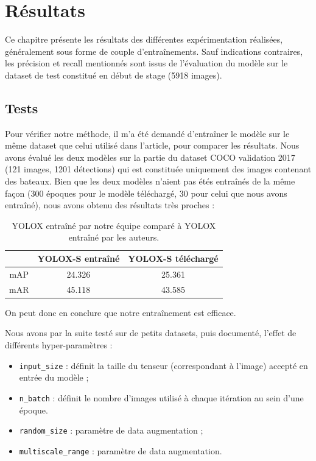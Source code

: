 \chapter{Résultats}\label{resultats}

Ce chapitre présente les résultats des différentes expérimentation réalisées,
généralement sous forme de couple d'entraînements. Sauf indications contraires,
les précision et recall mentionnés sont issus de l'évaluation du modèle sur le
dataset de test constitué en début de stage (5918 images).

\section{Tests}


Pour vérifier notre méthode, il m'a été demandé d'entraîner le modèle sur le même dataset que celui utilisé
dans l'article, pour comparer les résultats. Nous avons évalué les deux modèles sur la partie du dataset
COCO validation 2017 (121 images, 1201 détections) qui est constituée uniquement des images
contenant des bateaux.
Bien que les deux modèles n'aient pas étés entraînés de la même façon (300 époques pour le modèle téléchargé,
30 pour celui que nous avons entraîné), nous avons obtenu des résultats très proches :

\begin{table}[!h]
    \caption{YOLOX entraîné par notre équipe comparé à YOLOX entraîné par les auteurs.}
\begin{center}
    \begin{tabular}{ c c c }
        \hline
        & YOLOX-S entraîné & YOLOX-S téléchargé \\
        \hline
        mAP & 24.326 & 25.361 \\
        mAR & 45.118 & 43.585
    \end{tabular}
\end{center}
\end{table}

On peut donc en conclure que notre entraînement est efficace.

Nous avons par la suite testé sur de petits datasets, puis documenté,
l'effet de différents hyper-paramètres :

\begin{itemize}
    \item \texttt{input\_size} : définit la taille du tenseur (correspondant à l'image) accepté en entrée du modèle ;
    \item \texttt{n\_batch} : définit le nombre d'images utilisé à chaque itération au sein d'une époque.
    \item \texttt{random\_size} : paramètre de data augmentation ;
    \item \texttt{multiscale\_range} : paramètre de data augmentation.
\end{itemize}

